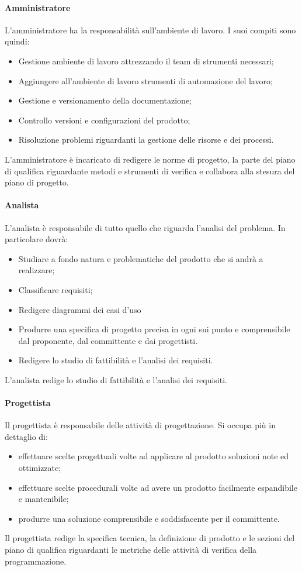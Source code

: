 		\paragraph{Amministratore}
		L'amministratore ha la responsabilità sull'ambiente di lavoro.
		I suoi compiti sono quindi:
		\begin{itemize}
			\item Gestione ambiente di lavoro attrezzando il team di strumenti necessari;
			\item Aggiungere all'ambiente di lavoro strumenti di automazione del lavoro;
			\item Gestione e versionamento della documentazione;
			\item Controllo versioni e configurazioni del prodotto;
			\item Risoluzione problemi riguardanti la gestione delle risorse e dei processi.
		\end{itemize}
		L'amministratore è incaricato di redigere le norme di progetto, la parte del piano di qualifica riguardante metodi e strumenti di verifica e collabora alla stesura del piano di progetto.
		\paragraph{Analista}
		L'analista è responsabile di tutto quello che riguarda l'analisi del problema.
		In particolare dovrà:
		\begin{itemize}
			\item Studiare a fondo natura e problematiche del prodotto che si andrà a realizzare;
			\item Classificare requisiti;
			\item Redigere diagrammi dei casi d'uso
			\item Produrre una specifica di progetto precisa in ogni sui punto e comprensibile dal proponente, dal committente e dai progettisti.
			\item Redigere lo studio di fattibilità e l'analisi dei requisiti.
		\end{itemize}
		L'analista redige lo studio di fattibilità e l'analisi dei requisiti.
		\paragraph{Progettista}
		Il progettista è responsabile delle attività di progettazione. Si occupa più in dettaglio di:
		\begin{itemize}
			\item effettuare scelte progettuali volte ad applicare al prodotto soluzioni note ed ottimizzate;
			\item effettuare scelte procedurali volte ad avere un prodotto facilmente espandibile e mantenibile;
			\item produrre una soluzione comprensibile e soddisfacente per il committente.
		\end{itemize}
		Il progettista redige la specifica tecnica, la definizione di prodotto e le sezioni del piano di qualifica riguardanti le metriche delle attività di verifica della programmazione.
